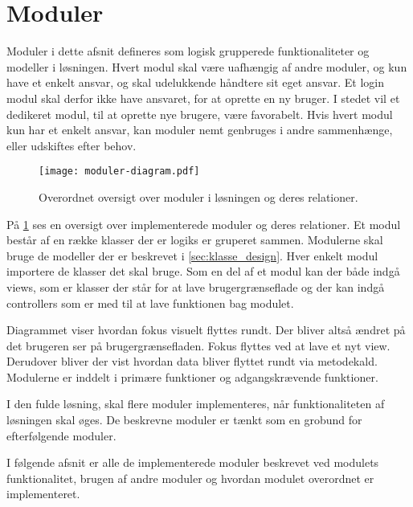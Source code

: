 \section{Moduler}
\label{sec:moduler}

Moduler i dette afsnit defineres som logisk grupperede funktionaliteter og modeller i løsningen. Hvert modul skal være uafhængig af andre moduler, og kun have et enkelt ansvar, og skal udelukkende håndtere sit eget ansvar. Et login modul skal derfor ikke have ansvaret, for at oprette en ny bruger. I stedet vil et dedikeret modul, til at oprette nye brugere, være favorabelt. Hvis hvert modul kun har et enkelt ansvar, kan moduler nemt genbruges i andre sammenhænge, eller udskiftes efter behov.

\begin{figure}
  \centering
  \texttt{[image: moduler-diagram.pdf]}
  \caption{Overordnet oversigt over moduler i løsningen og deres relationer.}
  \label{fig:mod}
\end{figure}



På \cref{fig:mod} ses en oversigt over implementerede moduler og deres relationer. Et modul består af en række klasser der er logiks er gruperet sammen. Modulerne skal bruge de modeller der er beskrevet i \cref{sec:klasse_design}. Hver enkelt modul importere de klasser det skal bruge. Som en del af et modul kan der både indgå views, som er klasser der står for at lave brugergrænseflade og der kan indgå controllers som er med til at lave funktionen bag modulet.


Diagrammet viser hvordan fokus visuelt flyttes rundt. Der bliver altså ændret på det brugeren ser på brugergrænsefladen. Fokus flyttes ved at lave et nyt view. Derudover bliver der vist hvordan data bliver flyttet rundt via metodekald. Modulerne er inddelt i primære funktioner og adgangskrævende funktioner.

I den fulde løsning, skal flere moduler implementeres, når funktionaliteten af løsningen skal øges. De beskrevne moduler er tænkt som en grobund for efterfølgende moduler.

I følgende afsnit er alle de implementerede moduler beskrevet ved modulets funktionalitet, brugen af andre moduler og hvordan modulet overordnet er implementeret.









